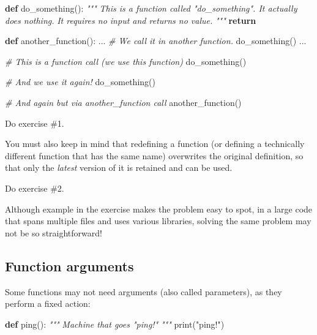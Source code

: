\documentclass[
]{book}
\newenvironment{Shaded}{\begin{snugshade}}{\end{snugshade}}
\newcommand{\BuiltInTok}[1]{#1}
\newcommand{\CommentTok}[1]{\textcolor[rgb]{0.56,0.35,0.01}{\textit{#1}}}
\newcommand{\ControlFlowTok}[1]{\textcolor[rgb]{0.13,0.29,0.53}{\textbf{#1}}}
\newcommand{\KeywordTok}[1]{\textcolor[rgb]{0.13,0.29,0.53}{\textbf{#1}}}
\newcommand{\NormalTok}[1]{#1}
\newcommand{\StringTok}[1]{\textcolor[rgb]{0.31,0.60,0.02}{#1}}
\begin{document}
\begin{Shaded}
\begin{Highlighting}[]
\KeywordTok{def}\NormalTok{ do\_something():}
    \CommentTok{"""}
\CommentTok{    This is a function called "do\_something". It actually does nothing.}
\CommentTok{    It requires no input and returns no value.}
\CommentTok{    """}
    \ControlFlowTok{return}
    
\KeywordTok{def}\NormalTok{ another\_function():}
\NormalTok{    ...}
    \CommentTok{\# We call it in another function.}
\NormalTok{    do\_something()}
\NormalTok{    ...}

\CommentTok{\# This is a function call (we use this function)}
\NormalTok{do\_something()}

\CommentTok{\# And we use it again!}
\NormalTok{do\_something()}

\CommentTok{\# And again but via another\_function call}
\NormalTok{another\_function()}
\end{Highlighting}
\end{Shaded}

Do exercise \#1.

You must also keep in mind that redefining a function (or defining a technically different function that has the same name) overwrites the original definition, so that only the \emph{latest} version of it is retained and can be used.

Do exercise \#2.

Although example in the exercise makes the problem easy to spot, in a large code that spans multiple files and uses various libraries, solving the same problem may not be so straightforward!

\hypertarget{function-arguments}{%
\subsection{Function arguments}\label{function-arguments}}

Some functions may not need arguments (also called parameters), as they perform a fixed action:

\begin{Shaded}
\begin{Highlighting}[]
\KeywordTok{def}\NormalTok{ ping():}
    \CommentTok{"""}
\CommentTok{    Machine that goes "ping!"}
\CommentTok{    """}
    \BuiltInTok{print}\NormalTok{(}\StringTok{"ping!"}\NormalTok{)}
\end{Highlighting}
\end{Shaded}
\end{document}
